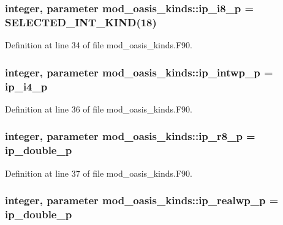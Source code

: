 \hypertarget{classmod__oasis__kinds_a8dbd6aa926433f02df94bca462f122df}{
\subsubsection[{ip\+\_\+i8\+\_\+p}]{\setlength{\rightskip}{0pt plus 5cm}integer, parameter mod\+\_\+oasis\+\_\+kinds\+::ip\+\_\+i8\+\_\+p = S\+E\+L\+E\+C\+T\+E\+D\+\_\+\+I\+N\+T\+\_\+\+K\+I\+N\+D(18)}}\label{classmod__oasis__kinds_a8dbd6aa926433f02df94bca462f122df}


Definition at line 34 of file mod\+\_\+oasis\+\_\+kinds.\+F90.

\hypertarget{classmod__oasis__kinds_a7bf99d9ca4dbcaa5e6207e48835d2ca2}{
\subsubsection[{ip\+\_\+intwp\+\_\+p}]{\setlength{\rightskip}{0pt plus 5cm}integer, parameter mod\+\_\+oasis\+\_\+kinds\+::ip\+\_\+intwp\+\_\+p = {\bf ip\+\_\+i4\+\_\+p}}}\label{classmod__oasis__kinds_a7bf99d9ca4dbcaa5e6207e48835d2ca2}


Definition at line 36 of file mod\+\_\+oasis\+\_\+kinds.\+F90.

\hypertarget{classmod__oasis__kinds_a6129e979d32b55cb020fb76068ce9808}{
\subsubsection[{ip\+\_\+r8\+\_\+p}]{\setlength{\rightskip}{0pt plus 5cm}integer, parameter mod\+\_\+oasis\+\_\+kinds\+::ip\+\_\+r8\+\_\+p = {\bf ip\+\_\+double\+\_\+p}}}\label{classmod__oasis__kinds_a6129e979d32b55cb020fb76068ce9808}


Definition at line 37 of file mod\+\_\+oasis\+\_\+kinds.\+F90.

\hypertarget{classmod__oasis__kinds_a3875d67b4b579bb15696c55b5547d3c4}{
\subsubsection[{ip\+\_\+realwp\+\_\+p}]{\setlength{\rightskip}{0pt plus 5cm}integer, parameter mod\+\_\+oasis\+\_\+kinds\+::ip\+\_\+realwp\+\_\+p = {\bf ip\+\_\+double\+\_\+p}}}\label{classmod__oasis__kinds_a3875d67b4b579bb15696c55b5547d3c4}


